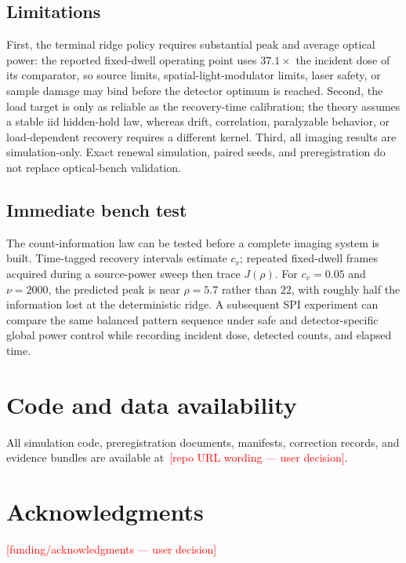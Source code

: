 \documentclass[10pt,twocolumn]{article}
\newcommand{\SPH}[1]{\textcolor{red}{[#1]}}
\begin{document}
\subsection{Limitations}
First, the terminal ridge policy requires substantial peak and average optical
power: the reported fixed-dwell operating point uses $37.1\times$ the incident
dose of its comparator, so source limits, spatial-light-modulator limits,
laser safety, or sample damage may bind before the detector optimum is reached.
Second, the load target is only as reliable as the recovery-time calibration;
the theory assumes a stable iid hidden-hold law, whereas drift, correlation,
paralyzable behavior, or load-dependent recovery requires a different kernel.
Third, all imaging results are simulation-only. Exact renewal simulation,
paired seeds, and preregistration do not replace optical-bench validation.

\subsection{Immediate bench test}
The count-information law can be tested before a complete imaging system is
built. Time-tagged recovery intervals estimate $c_v$; repeated fixed-dwell
frames acquired during a source-power sweep then trace $J(\rho)$. For
$c_v=0.05$ and $\nu=2000$, the predicted peak is near $\rho=5.7$ rather than
$22$, with roughly half the information lost at the deterministic ridge. A
subsequent SPI experiment can compare the same balanced pattern sequence under
safe and detector-specific global power control while recording incident dose,
detected counts, and elapsed time.

\section*{Code and data availability}
All simulation code, preregistration documents, manifests, correction records,
and evidence bundles are available at~\SPH{repo URL wording --- user decision}.

\section*{Acknowledgments}
\SPH{funding/acknowledgments --- user decision}



\end{document}
